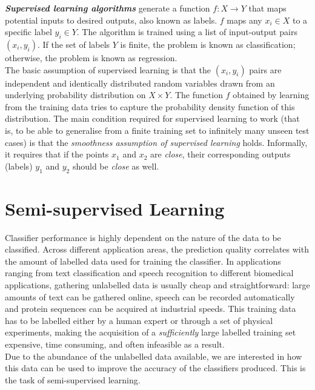 \documentclass[12pt,twoside,notitlepage,amsart]{report} %
\begin{document}
	\textbf{\emph{Supervised learning algorithms}} generate a function $f:X \rightarrow Y$ that maps potential inputs to desired outputs, also known as labels. $f$ maps any $x_i \in X$ to a specific label $y_i \in Y$. The algorithm is trained using a list of input-output pairs $(x_i, y_i)$. If the set of labels $Y$ is finite, the problem is known as classification; otherwise, the problem is known as regression. \\
	
	
	The basic assumption of supervised learning is that the $(x_i, y_i)$ pairs are independent and identically distributed  random variables drawn from an underlying probability distribution on $X \times Y$. The function $f$ obtained by learning from the training data tries to capture the probability density function of this distribution. The main condition required for supervised learning to work (that is, to be able to generalise from a finite training set to infinitely many unseen test cases) is that the \emph{smoothness assumption of supervised learning} holds. Informally, it requires that if the points $x_1$ and $x_2$ are \emph{close}, their corresponding outputs (labels) $y_1$ and $y_2$ should be \emph{close} as well.
	
	
	\section{Semi-supervised Learning}
	
	Classifier performance is highly dependent on the nature of the data to be classified. Across different application areas, the prediction quality correlates with the amount of labelled data used for training the classifier. In applications ranging from text classification and speech recognition to different biomedical applications, gathering unlabelled data is usually cheap and straightforward: large amounts of text can be gathered online, speech can be recorded automatically and protein sequences can be acquired at industrial speeds. This training data has to be labelled either by a human expert or through a set of physical experiments, making the acquisition of a \emph{sufficiently} large labelled training set expensive, time consuming, and often infeasible as a result. \\
	
	Due to the abundance of the unlabelled data available, we are interested in how this data can be used to improve the accuracy of the classifiers produced. This is the task of semi-supervised learning. \\
	
\end{document}
